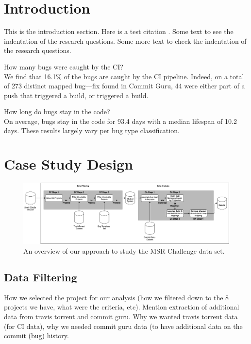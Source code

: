 \documentclass[10pt,conference]{IEEEtran}
\begin{document}
\section{Introduction}
This is the introduction section. Here is a test citation \cite{abdalkareem_2020_a}. Some text to see the indentation of the research questions. Some more text to check the indentation of the research questions.
\begin{questions}
    \item How many bugs were caught by the CI? \\ We find that 16.1\% of the bugs are caught by the CI pipeline. Indeed, on a total of 273 distinct mapped bug---fix found in Commit Guru, 44 were either part of a push that triggered a build, or triggered a build. 
\end{questions}
\begin{questions}[resume]
    \item How long do bugs stay in the code? \\ On average, bugs stay in the code for 93.4 days with a median lifespan of 10.2 days. These results largely vary per bug type classification.  
\end{questions}

\section{Case Study Design}
\begin{figure}[t]
\centering
\includegraphics[width=\linewidth]{process.png}
\caption{An overview of our approach to study the MSR Challenge data set.}
\label{fig:process}
\end{figure}

\subsection{Data Filtering}
How we selected the project for our analysis (how we filtered down to the 8 projects we have, what were the criteria, etc). Mention extraction of additional data from travis torrent and commit guru. Why we wanted travis torrent data (for CI data), why we needed commit guru data (to have additional data on the commit (bug) history.
\end{document}
